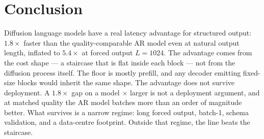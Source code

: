 \section{Conclusion}
\label{sec:conclusion} Diffusion language models have a real latency advantage for structured
output: $1.8\times$ faster than the quality-comparable AR model even at natural
output length, inflated to $5.4\times$ at forced output $L{=}1024$. The
advantage comes from the cost shape --- a staircase that is flat inside each
block --- not from the diffusion process itself. The floor is mostly prefill,
and any decoder emitting fixed-size blocks would inherit the same shape. The advantage does not survive deployment. A $1.8\times$ gap on a model
\footprintRatio$\times$ larger is not a deployment argument, and at matched
quality the AR model batches more than an order of magnitude better. What
survives is a narrow regime: long forced output, batch-1, schema validation,
and a data-centre footprint. Outside that regime, the line beats the
staircase.
